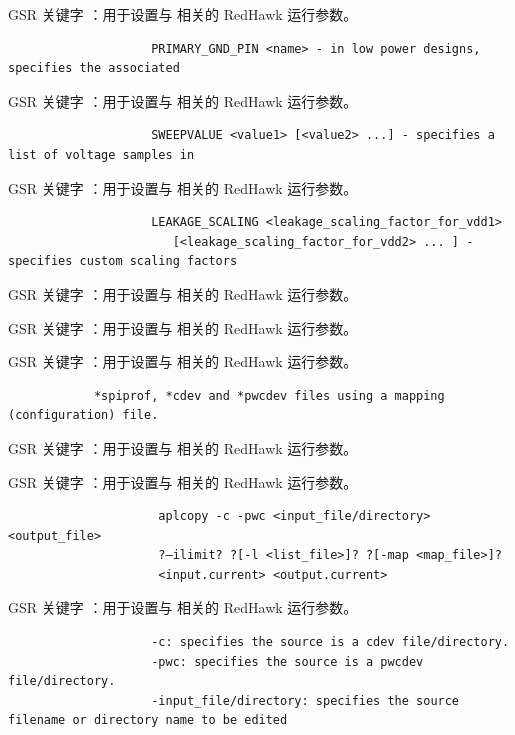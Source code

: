 GSR 关键字 ：用于设置与  相关的 RedHawk 运行参数。

\begin{lstlisting}
                    PRIMARY_GND_PIN <name> - in low power designs, specifies the associated
\end{lstlisting}

GSR 关键字 ：用于设置与  相关的 RedHawk 运行参数。

\begin{lstlisting}
                    SWEEPVALUE <value1> [<value2> ...] - specifies a list of voltage samples in
\end{lstlisting}

GSR 关键字 ：用于设置与  相关的 RedHawk 运行参数。

\begin{lstlisting}
                    LEAKAGE_SCALING <leakage_scaling_factor_for_vdd1>
                       [<leakage_scaling_factor_for_vdd2> ... ] - specifies custom scaling factors
\end{lstlisting}

GSR 关键字 ：用于设置与  相关的 RedHawk 运行参数。

GSR 关键字 ：用于设置与  相关的 RedHawk 运行参数。

GSR 关键字 ：用于设置与  相关的 RedHawk 运行参数。

\begin{lstlisting}
            *spiprof, *cdev and *pwcdev files using a mapping (configuration) file.
\end{lstlisting}

GSR 关键字 ：用于设置与  相关的 RedHawk 运行参数。

GSR 关键字 ：用于设置与  相关的 RedHawk 运行参数。

\begin{lstlisting}
                     aplcopy -c -pwc <input_file/directory> <output_file>
                     ?–ilimit? ?[-l <list_file>]? ?[-map <map_file>]?
                     <input.current> <output.current>
\end{lstlisting}

GSR 关键字 ：用于设置与  相关的 RedHawk 运行参数。

\begin{lstlisting}
                    -c: specifies the source is a cdev file/directory.
                    -pwc: specifies the source is a pwcdev file/directory.
                    -input_file/directory: specifies the source filename or directory name to be edited
\end{lstlisting}

